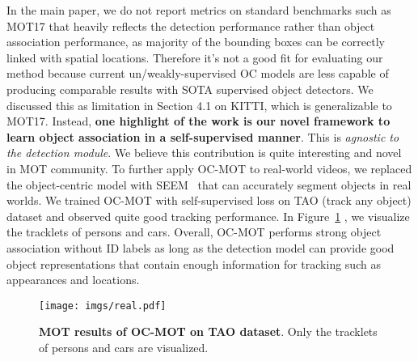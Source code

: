 \documentclass[10pt,twocolumn,letterpaper]{article}
\begin{document}
\begin{appendices}
In the main paper, we do not report metrics on standard benchmarks such as MOT17 that  heavily reflects the detection performance rather than object association performance, as majority of the bounding boxes can be correctly linked with spatial locations. Therefore it's not a good fit for evaluating our method because current un/weakly-supervised OC models are less capable of producing comparable results with SOTA supervised object detectors. We discussed this as limitation in Section 4.1 on KITTI, which is generalizable to MOT17. Instead, \textbf{one highlight of the work is our novel framework to learn object association in a self-supervised manner}. This is \textit{agnostic to the detection module}. We believe this contribution is quite interesting and novel in MOT community. To further apply OC-MOT to real-world videos, we replaced the object-centric model with SEEM~\cite{zou2023segment} that can accurately segment objects in real worlds. We trained OC-MOT with self-supervised loss on TAO (track any object) dataset and observed quite good tracking performance. In Figure~\ref{fig:reald} , we visualize the tracklets of persons and cars. Overall, OC-MOT performs strong object association without ID labels as long as the detection model can provide good object representations that contain enough information for tracking such as appearances and locations.
\begin{figure}[t]
	\centering
	\texttt{[image: imgs/real.pdf]}
\caption{\textbf{MOT results of OC-MOT on TAO dataset}. Only the tracklets of persons and cars are visualized.}
\label{fig:reald}
\end{figure}

\end{appendices}
\end{document}
